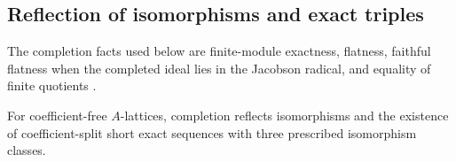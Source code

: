 \subsection{Reflection of isomorphisms and exact triples}

The completion facts used below are finite-module exactness,
flatness, faithful flatness when the completed ideal lies in the
Jacobson radical, and equality of finite quotients
\citep[Lemmas~10.97.1--10.97.4, Tags 00MA, 00MB, 00MC, 031C]{Stacks2026}.

\begin{lemma}\label{lem:completion-reflects-triples}
For coefficient-free $A$-lattices, completion reflects
isomorphisms and the existence of coefficient-split short exact
sequences with three prescribed isomorphism classes.
\end{lemma}

